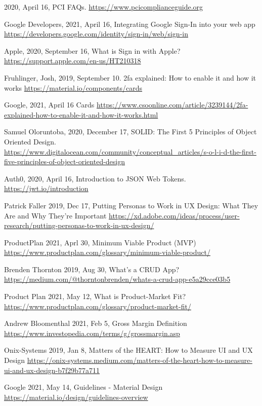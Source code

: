 \begin{thebibliography}{9} 
    2020, April 16,
    PCI FAQs.
    \url{https://www.pcicomplianceguide.org}

    Google Developers,
    2021, April 16,
    Integrating Google Sign-In into your web app
    \url{https://developers.google.com/identity/sign-in/web/sign-in}

    Apple,
    2020, September 16,
    What is Sign in with Apple?
    \url{https://support.apple.com/en-us/HT210318}

    Fruhlinger, Josh,
    2019, September 10.
    2fa explained: How to enable it and how it works
    \url{https://material.io/components/cards}

    Google,
    2021, April 16 
    Cards
    \url{https://www.csoonline.com/article/3239144/2fa-explained-how-to-enable-it-and-how-it-works.html}

    Samuel Oloruntoba,
    2020, December 17,
    SOLID: The First 5 Principles of Object Oriented Design.
    \url{https://www.digitalocean.com/community/conceptual_articles/s-o-l-i-d-the-first-five-principles-of-object-oriented-design}

    Auth0,
    2020, April 16,
    Introduction to JSON Web Tokens.
    \url{https://jwt.io/introduction}

    Patrick Faller
    2019, Dec 17,
    Putting Personas to Work in UX Design: What They Are and Why They’re Important
    \url{https://xd.adobe.com/ideas/process/user-research/putting-personas-to-work-in-ux-design/}

    ProductPlan
    2021, Aprl 30,
    Minimum Viable Product (MVP)
    \url{https://www.productplan.com/glossary/minimum-viable-product/}

    Brenden Thornton
    2019, Aug 30,
    What’s a CRUD App?
    \url{https://medium.com/@thorntonbrenden/whats-a-crud-app-e5a29cce03b5}

    Product Plan
    2021, May 12,
    What is Product-Market Fit?
    \url{https://www.productplan.com/glossary/product-market-fit/}

    Andrew Bloomenthal
    2021, Feb 5,
    Gross Margin Definition
    \url{https://www.investopedia.com/terms/g/grossmargin.asp}

    Onix-Systems
    2019, Jan 8,
    Matters of the HEART: How to Measure UI and UX Design
    \url{https://onix-systems.medium.com/matters-of-the-heart-how-to-measure-ui-and-ux-design-b7f29b77a711}

    Google
    2021, May 14,
    Guidelines - Material Design
    \url{https://material.io/design/guidelines-overview}
\end{thebibliography}
